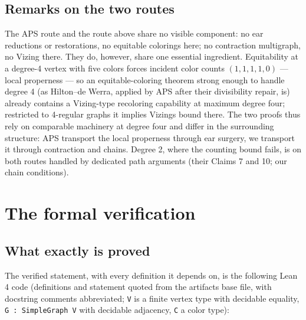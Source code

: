 \documentclass[11pt]{article}
\theoremstyle{definition}
\theoremstyle{remark}
\begin{document}
\subsection{Remarks on the two routes}\label{27-remarks-on-the-two-routes}

The APS route and the route above share no visible component: no ear reductions or restorations, no equitable colorings here; no contraction multigraph, no Vizing there. They do, however, share one essential ingredient. Equitability at a degree-4 vertex with five colors forces incident color counts \((1,1,1,1,0)\) --- local properness --- so an equitable-coloring theorem strong enough to handle degree 4 (as Hilton--de Werra, applied by APS after their divisibility repair, is) already contains a Vizing-type recoloring capability at maximum degree four; restricted to 4-regular graphs it implies Vizing\textquotesingle s bound there. The two proofs thus rely on comparable machinery at degree four and differ in the surrounding structure: APS transport the local properness through ear surgery, we transport it through contraction and chains. Degree 2, where the counting bound fails, is on both routes handled by dedicated path arguments (their Claims 7 and 10; our chain conditions).


\section{The formal verification}\label{3-the-formal-verification}

\subsection{What exactly is proved}\label{31-what-exactly-is-proved}

The verified statement, with every definition it depends on, is the following Lean 4 code (definitions and statement quoted from the artifact\textquotesingle s base file, with docstring comments abbreviated; \texttt{V} is a finite vertex type with decidable equality, \texttt{G\ :\ SimpleGraph\ V} with decidable adjacency, \texttt{C} a color type):
\end{document}
